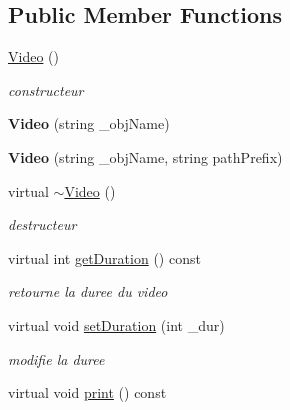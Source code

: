 \subsection*{Public Member Functions}
\begin{DoxyCompactItemize}
\item 
\hypertarget{classVideo_ab67336c2c5b6227a9635bc7dcd6af543}{\hyperlink{classVideo_ab67336c2c5b6227a9635bc7dcd6af543}{Video} ()}\label{classVideo_ab67336c2c5b6227a9635bc7dcd6af543}

\begin{DoxyCompactList}\small\item\em constructeur \end{DoxyCompactList}\item 
\hypertarget{classVideo_a186317d34984ad628c3a75c70ba57c64}{{\bfseries Video} (string \-\_\-obj\-Name)}\label{classVideo_a186317d34984ad628c3a75c70ba57c64}

\item 
\hypertarget{classVideo_a721b644bc5cb1b01c65ebe55cb0ce96e}{{\bfseries Video} (string \-\_\-obj\-Name, string path\-Prefix)}\label{classVideo_a721b644bc5cb1b01c65ebe55cb0ce96e}

\item 
\hypertarget{classVideo_aebf7e2a8fa2bbd79335b1cf35925d190}{virtual \hyperlink{classVideo_aebf7e2a8fa2bbd79335b1cf35925d190}{$\sim$\-Video} ()}\label{classVideo_aebf7e2a8fa2bbd79335b1cf35925d190}

\begin{DoxyCompactList}\small\item\em destructeur \end{DoxyCompactList}\item 
virtual int \hyperlink{classVideo_ac8fae47847a7a52762e9b167f52a9bfd}{get\-Duration} () const 
\begin{DoxyCompactList}\small\item\em retourne la duree du video \end{DoxyCompactList}\item 
\hypertarget{classVideo_acceac3b8030a10e7d7fe4778c729abea}{virtual void \hyperlink{classVideo_acceac3b8030a10e7d7fe4778c729abea}{set\-Duration} (int \-\_\-dur)}\label{classVideo_acceac3b8030a10e7d7fe4778c729abea}

\begin{DoxyCompactList}\small\item\em modifie la duree \end{DoxyCompactList}\item 
\hypertarget{classVideo_ab554ec75296a52a815ef1cd0cca4d574}{virtual void \hyperlink{classVideo_ab554ec75296a52a815ef1cd0cca4d574}{print} () const }\label{classVideo_ab554ec75296a52a815ef1cd0cca4d574}


\end{DoxyCompactItemize}
